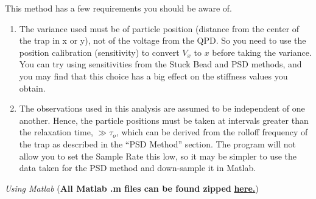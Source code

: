 \documentclass{../lab}
\begin{document}
This method has a few requirements you should be aware of.

\begin{enumerate}
    \item The variance used must be of particle position (distance from the center of the trap in x or y), not of the voltage from the QPD. So you need to use the position calibration (sensitivity) to convert $V_x$ to $x$ before taking the variance. You can try using sensitivities from the Stuck Bead and PSD methods, and you may find that this choice has a big effect on the stiffness values you obtain.

    \item The observations used in this analysis are assumed to be independent of one another. Hence, the particle positions must be taken at intervals greater than the relaxation time, $\gg \tau_o$, which can be derived from the rolloff frequency of the trap as described in the ``PSD Method'' section. The program will not allow you to set the Sample Rate this low, so it may be simpler to use the data taken for the PSD method and down-sample it in Matlab.

\end{enumerate}

\emph{Using Matlab } (\textbf{All Matlab .m files can be found zipped }\href{http://dev-physicsadv.pantheon.berkeley.edu/sites/default/files/ZIP\_files/OTZ\_Matlab\_files.zip}{\textbf{here.}})
\end{document}
